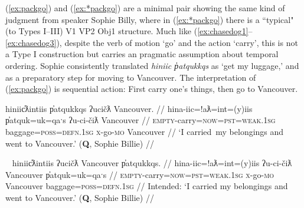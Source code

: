 (\ref{ex:packgo}) and (\ref{ex:*packgo}) are a minimal pair showing the same kind of judgment from speaker Sophie Billy, where in (\ref{ex:*packgo}) there is a ``typical" (to Types I--III) V1 VP2 Obj1 structure. Much like (\ref{ex:chasedog1}--\ref{ex:chasedog3}), despite the verb of motion `go' and the action `carry', this is not a Type I construction but carries an pragmatic assumption about temporal ordering. Sophie consistently translated \textit{hiniic p̓atqukkqs} as `get my luggage,' and as a preparatory step for moving to Vancouver. The interpretation of (\ref{ex:packgo}) is sequential action: First carry one's things, then go to Vancouver.

\ex \label{ex:packgo}
\begingl
\glpreamble hiniic̓ƛintiis p̓atqukkqs ʔucičƛ Vancouver. //
\gla hina-iic=!aƛ=int=(y)iis p̓atquk=uk=qaˑs ʔu-ci-čiƛ Vancouver //
\glb \textsc{empty}-carry=\textsc{now}=\textsc{pst}=\textsc{weak.1sg} baggage=\textsc{poss}=\textsc{defn.1sg} \textsc{x}-go-\textsc{mo} Vancouver //
\glft `I carried\footnotemark\ my belongings and went to Vancouver.' (\textbf{Q}, Sophie Billie) //
\endgl
\xe


\ex~ \label{ex:*packgo}
\begingl
\glpreamble *hiniic̓ƛintiis ʔucičƛ Vancouver p̓atqukkqs. //
\gla hina-iic=!aƛ=int=(y)iis ʔu-ci-čiƛ Vancouver p̓atquk=uk=qaˑs //
\glb \textsc{empty}-carry=\textsc{now}=\textsc{pst}=\textsc{weak.1sg} \textsc{x}-go-\textsc{mo} Vancouver baggage=\textsc{poss}=\textsc{defn.1sg} //
\glft Intended: `I carried my belongings and went to Vancouver.' (\textbf{Q}, Sophie Billie) //
\endgl
\xe


\begin{comment}
actions performed while changing locations (e.g., carry + go as in \ref{ex:carryluggage}),

\ex~ \label{ex:carryluggage}
\begingl
\glpreamble hiniic̓aƛna p̓atquk ʔucačiƛ Qualicum. //
\gla hina-iic=!aƛ=naˑ p̓atquk ʔu-ca-čiƛ Qualicum //
\glb \textsc{empty}-carry=\textsc{now}=\textsc{strg.1pl} belongings \textsc{x}-go.to-\textsc{mo} Qualicum //
\glft `We are taking our belongings going to Qualicum.' (\textbf{C}, \textit{tupaat} Julia Lucas) //
\endgl
\xe 
\end{comment}

